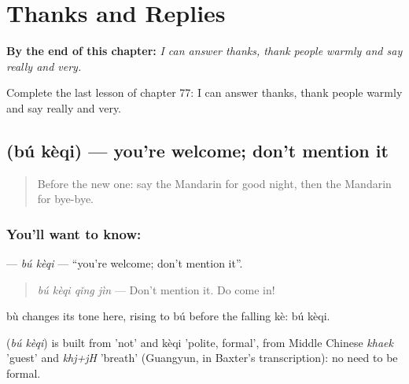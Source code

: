 
\chapter{Thanks and Replies}
\label{ch:zh-thanks-and-replies}

\begin{chapteropening}
\textbf{By the end of this chapter:} \emph{I can answer thanks, thank people warmly and say really and very.}

Complete the last lesson of chapter 77: I can answer thanks, thank people warmly and say really and very.
\end{chapteropening}

\section[\texorpdfstring{\zh{不客气} (bú kèqi)}{不客气 (bú kèqi)}]{ (bú kèqi) — you're welcome; don't mention it}

\label{lesson:ZH-C77-bukeqi}



\begin{quote}
Before the new one: say the Mandarin for good night, then the Mandarin for bye-bye.
\end{quote}

\subsection*{You'll want to know: }
\textbf{} — \emph{bú kèqi} — \textquotedblleft{}you're welcome; don't mention it\textquotedblright{}.

\begin{quote}
\textbf{} \emph{bú kèqi qǐng jìn} — Don't mention it. Do come in!
\end{quote}

bù changes its tone here, rising to bú before the falling kè: bú kèqi.

\begin{cousinweb}
\textbf{} (\emph{bú kèqi}) is built from  'not' and kèqi 'polite, formal', from Middle Chinese \emph{khaek} 'guest' and \emph{khj+jH} 'breath' (Guangyun, in Baxter's transcription): no need to be formal.
\end{cousinweb}

